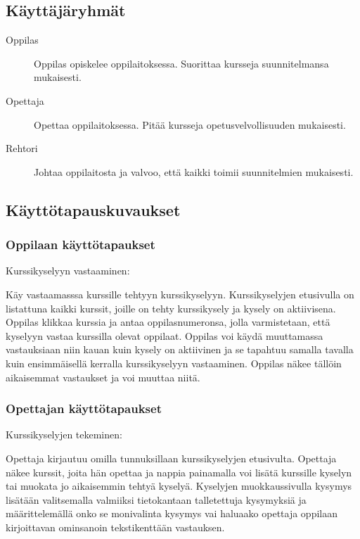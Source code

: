\documentclass[12pt,twoside,a4paper,leqno,titlepage]{article}
\begin{document}
\subsection{Käyttäjäryhmät}

\begin{description}
  \item[Oppilas] Oppilas opiskelee oppilaitoksessa. Suorittaa kursseja 
  suunnitelmansa mukaisesti.
  \item[Opettaja] Opettaa oppilaitoksessa. Pitää kursseja opetusvelvollisuuden
  mukaisesti.
  \item[Rehtori] Johtaa oppilaitosta ja valvoo, että kaikki toimii suunnitelmien
  mukaisesti.
\end{description}

\subsection{Käyttötapauskuvaukset}

\subsubsection*{Oppilaan käyttötapaukset}

Kurssikyselyyn vastaaminen:

Käy vastaamasssa kurssille tehtyyn kurssikyselyyn. Kurssikyselyjen etusivulla on
listattuna kaikki kurssit, joille on tehty kurssikysely ja kysely on aktiivisena.
Oppilas klikkaa kurssia ja antaa oppilasnumeronsa, jolla varmistetaan, että kyselyyn
vastaa kurssilla olevat oppilaat. Oppilas voi käydä muuttamassa vastauksiaan niin
kauan kuin kysely on aktiivinen ja se tapahtuu samalla tavalla kuin ensimmäisellä
kerralla kurssikyselyyn vastaaminen. Oppilas näkee tällöin aikaisemmat vastaukset
ja voi muuttaa niitä.

\subsubsection*{Opettajan käyttötapaukset}

Kurssikyselyjen tekeminen:

Opettaja kirjautuu omilla tunnuksillaan kurssikyselyjen etusivulta.
Opettaja näkee kurssit, joita hän opettaa ja nappia painamalla voi lisätä kurssille
kyselyn tai muokata jo aikaisemmin tehtyä kyselyä. Kyselyjen muokkaussivulla
kysymys lisätään valitsemalla valmiiksi tietokantaan talletettuja kysymyksiä ja
määrittelemällä onko se monivalinta kysymys vai haluaako opettaja oppilaan kirjoittavan
ominsanoin tekstikenttään vastauksen.
\end{document}
